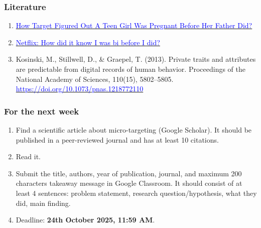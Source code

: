 \documentclass[aspectratio=169]{beamer}
\begin{document}
\begin{frame}
    \frametitle{Literature}
    \scriptsize
    \begin{enumerate}
        \item \href{https://www.forbes.com/sites/kashmirhill/2012/02/16/how-target-figured-out-a-teen-girl-was-pregnant-before-her-father-did/?sh=1333c4646668}{\textcolor{blue}{How Target Figured Out A Teen Girl Was Pregnant Before Her Father Did?}}
        \item \href{https://www.bbc.com/news/technology-66472938}{\textcolor{blue}{Netflix: How did it know I was bi before I did?}}
        \item Kosinski, M., Stillwell, D., \& Graepel, T. (2013). Private traits and attributes are predictable from digital records of human behavior. Proceedings of the National Academy of Sciences, 110(15), 5802–5805. \href{https://doi.org/10.1073/pnas.1218772110}{\textcolor{blue}{https://doi.org/10.1073/pnas.1218772110}}
    \end{enumerate}
\end{frame}

\begin{frame}
    \frametitle{For the next week}
    \begin{enumerate}
        \item Find a scientific article about micro-targeting (Google Scholar). It should be published in a peer-reviewed journal and has at least 10 citations.
        \item Read it.
        \item Submit the title, authors, year of publication, journal, and maximum 200 characters takeaway message in Google Classroom. It should consist of at least 4 sentences: problem statement, research question/hypothesis, what they did, main finding.
        \item Deadline: \textbf{24th October 2025, 11:59 AM}.
    \end{enumerate}
\end{frame}
\end{document}
